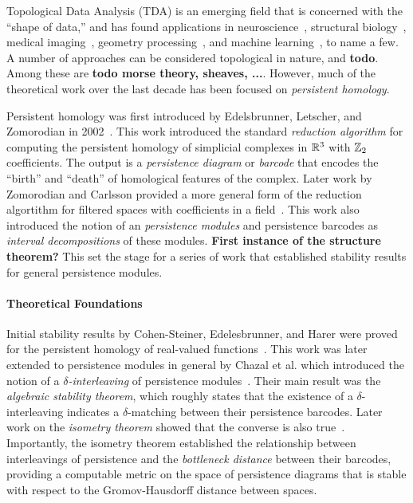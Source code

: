 
Topological Data Analysis (TDA) is an emerging field that is concerned with the ``shape of data,'' and has found applications in
neuroscience~\cite{saggar2018towards, sizemore2019importance},
structural biology~\cite{gameiro2015topological,kovacev2016using,dey2018protein},
medical imaging~\cite{carlsson2008local,robins2011theory,bendich2016persistent},
geometry processing~\cite{skraba2010persistence,poulenard2018topological,bruel2020topology},
and machine learning~\cite{clough2019explicit,chen2019topological,carlsson2020topological,gabrielsson2020topology}, to name a few.
A number of approaches can be considered topological in nature, and \textbf{todo}.
Among these are \textbf{todo morse theory, sheaves, ...}.
However, much of the theoretical work over the last decade has been focused on \emph{persistent homology}.

Persistent homology was first introduced by Edelsbrunner, Letscher, and Zomorodian in 2002~\cite{edelsbrunner02simplification}.
This work introduced the standard \emph{reduction algorithm} for computing the persistent homology of simplicial complexes in $\mathbb{R}^3$ with $\mathbb{Z}_2$ coefficients.
The output is a \emph{persistence diagram} or \emph{barcode} that encodes the ``birth'' and ``death'' of homological features of the complex.
Later work by Zomorodian and Carlsson provided a more general form of the reduction algortithm for filtered spaces with coefficients in a field~\cite{zomorodian05computing}.
This work also introduced the notion of an \emph{persistence modules} and persistence barcodes as \emph{interval decompositions} of these modules.
\textbf{First instance of the structure theorem?}
This set the stage for a series of work that established stability results for general persistence modules.

\paragraph{Theoretical Foundations}

Initial stability results by Cohen-Steiner, Edelesbrunner, and Harer were proved for the persistent homology of real-valued functions~\cite{cohensteiner07stability}.
This work was later extended to persistence modules in general by Chazal et al. which introduced the notion of a \emph{$\delta$-interleaving} of persistence modules~\cite{chazal09proximity}.
Their main result was the \emph{algebraic stability theorem}, which roughly states that the existence of a $\delta$-interleaving indicates a $\delta$-matching between their persistence barcodes.
Later work on the \emph{isometry theorem} showed that the converse is also true~\cite{todo}.
Importantly, the isometry theorem established the relationship between interleavings of persistence and the \emph{bottleneck distance} between their barcodes, providing a computable metric on the space of persistence diagrams that is stable with respect to the Gromov-Hausdorff distance between spaces.

